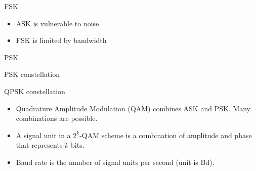 \begin{cf}{
	FSK
	\vspace{1cm}

}
\end{cf}

\begin{cf}{\small
	\begin{itemize}
	\item ASK is vulnerable to noise.
	\item FSK is limited by bandwidth
	\end{itemize}
}
\end{cf}

\begin{cf}{
	PSK
	\vspace{1cm}

}
\end{cf}

\begin{cf}{
	PSK constellation
	\vspace{1cm}

}
\end{cf}

\begin{cf}{
	QPSK constellation
	\vspace{1cm}

}
\end{cf}

\begin{cf}{\small
	\begin{itemize}
	\item Quadrature Amplitude Modulation (QAM) combines ASK and PSK.  Many combinations are possible.
	\item A signal unit in a $2^k$-QAM scheme is a combination of amplitude and phase that represents $k$ bits.
	\item Baud rate is the number of signal units per second (unit is Bd).
	\end{itemize}
}
\end{cf}


